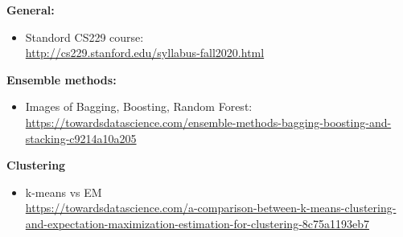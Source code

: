 \textbf{General: }
\begin{itemize}[leftmargin=*]
	\item Standord CS229 course: \\
		\url{http://cs229.stanford.edu/syllabus-fall2020.html} 
\end{itemize}

\textbf{Ensemble methods: }
\begin{itemize}[leftmargin=*]
	\item Images of Bagging, Boosting, Random Forest: \\
		\url{https://towardsdatascience.com/ensemble-methods-bagging-boosting-and-stacking-c9214a10a205}
\end{itemize}

\textbf{Clustering}
\begin{itemize}[leftmargin=*]
	\item k-means vs EM\\
	\url{https://towardsdatascience.com/a-comparison-between-k-means-clustering-and-expectation-maximization-estimation-for-clustering-8c75a1193eb7}
\end{itemize}